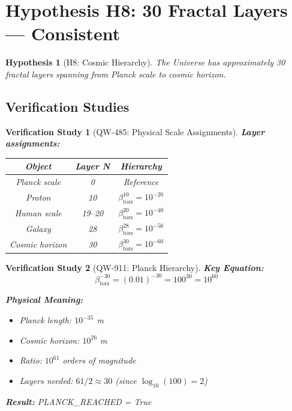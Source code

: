 \documentclass[11pt,a4paper]{book}
\newtheorem{hypothesis}{Hypothesis}[section]
\newtheorem{verification}{Verification Study}[section]
\theoremstyle{remark}
\newcommand{\betators}{\beta_{\text{tors}}}
\begin{document}
\section{Hypothesis H8: 30 Fractal Layers --- Consistent}

\begin{hypothesis}[H8: Cosmic Hierarchy]
The Universe has approximately 30 fractal layers spanning from Planck scale to cosmic horizon.
\end{hypothesis}

\subsection{Verification Studies}

\begin{verification}[QW-485: Physical Scale Assignments]
\textbf{Layer assignments:}
\begin{center}
\begin{tabular}{|c|c|c|}
\hline
\textbf{Object} & \textbf{Layer N} & \textbf{Hierarchy} \\
\hline
Planck scale & 0 & Reference \\
Proton & 10 & $\betators^{10} = 10^{-20}$ \\
Human scale & 19--20 & $\betators^{20} = 10^{-40}$ \\
Galaxy & 28 & $\betators^{28} = 10^{-56}$ \\
Cosmic horizon & 30 & $\betators^{30} = 10^{-60}$ \\
\hline
\end{tabular}
\end{center}
\end{verification}

\begin{verification}[QW-911: Planck Hierarchy]
\textbf{Key Equation:}
\begin{equation}
\boxed{\betators^{-30} = (0.01)^{-30} = 100^{30} = 10^{60}}
\end{equation}

\textbf{Physical Meaning:}
\begin{itemize}
    \item Planck length: $10^{-35}$ m
    \item Cosmic horizon: $10^{26}$ m
    \item Ratio: $10^{61}$ orders of magnitude
    \item Layers needed: $61 / 2 \approx 30$ (since $\log_{10}(100) = 2$)
\end{itemize}

\textbf{Result:} PLANCK\_REACHED = True
\end{verification}
\end{document}

